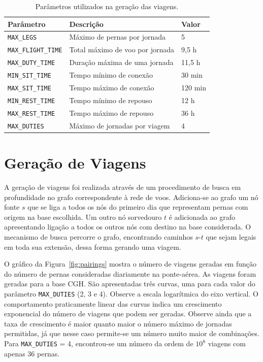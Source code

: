 \documentclass[12pt,a4paper]{article}
\newcommand{\zerar}{\setcounter{equation}{0}\setcounter{figure}{0}\setcounter{table}{0}}
\begin{document}
\begin{table}
	\begin{center}
		\begin{tabular}{|l|l|l|}
			\hline 
			\bf Parâmetro & \bf Descrição & \bf Valor \\
			\hline \hline 
			\verb|MAX_LEGS| & Máximo de pernas por jornada & 5 \\ \hline
			\verb|MAX_FLIGHT_TIME| & Total máximo de voo por jornada & 9,5 h \\ \hline
			\verb|MAX_DUTY_TIME| & Duração máxima de uma jornada & 11,5 h \\ \hline
			\verb|MIN_SIT_TIME| & Tempo mínimo de conexão & 30 min \\ \hline
			\verb|MAX_SIT_TIME| & Tempo máximo de conexão & 120 min \\ \hline
			\verb|MIN_REST_TIME| & Tempo mínimo de repouso & 12 h \\ \hline
			\verb|MAX_REST_TIME| & Tempo máximo de repouso & 36 h \\ \hline
			\verb|MAX_DUTIES| & Máximo de jornadas por viagem & 4 \\ \hline
			\end{tabular} 
			\caption{Parâmetros utilizados na geração das viagens.}
			\label{tab:parametros}
	\end{center}
\end{table}


\zerar
\section{Geração de Viagens}
\label{sec:geracao}

A geração de viagens foi realizada através de um procedimento de busca em profundidade no grafo
correspondente à rede de voos. Adiciona-se ao grafo um nó fonte $s$ que se liga a todos os nós do 
primeiro dia que representam pernas com origem na base escolhida. Um outro nó sorvedouro $t$ é 
adicionada ao grafo apresentando ligação a todos os outros nós com destino na base considerada. O 
mecanismo de busca percorre o grafo, encontrando caminhos $s$-$t$ que sejam legais em toda sua 
extensão, dessa forma gerando uma viagem.

O gráfico da Figura~\ref{fig:pairings} mostra o número de viagens geradas em função do número de
pernas consideradas diariamente na ponte-aérea. As viagens foram geradas para a base CGH. São 
apresentadas três curvas, uma para cada valor do parâmetro \verb|MAX_DUTIES| (2, 3 e 4). Observe a 
escala logarítmica do eixo vertical. O comportamento praticamente linear das curvas indica um 
crescimento exponencial do número de viagens que podem ser geradas. Observe ainda que a taxa de 
crescimento é maior quanto maior o número máximo de jornadas permitidas, já que nesse caso 
permite-se um número muito maior de combinações. Para \verb|MAX_DUTIES| = 4, encontrou-se um número 
da ordem de $10^8$ viagens com apenas 36 pernas.
\end{document}
